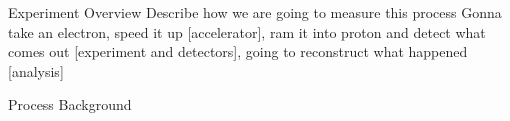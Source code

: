 \documentclass[aspectratio=169]{beamer}
\begin{document}
\begin{frame}{Experiment Overview}
Describe how we are going to measure this process
Gonna take an electron, speed it up [accelerator], ram it into proton and detect what comes out [experiment and detectors], going to reconstruct what happened [analysis]
\end{frame}


\begin{frame}{Process Background}

\end{frame}
\end{document}
